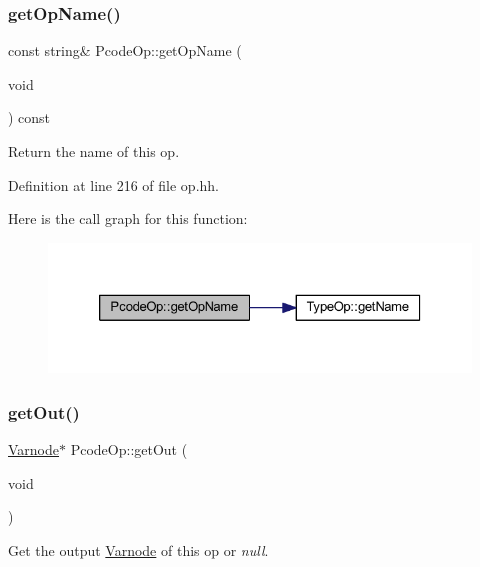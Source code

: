\subsubsection{\texorpdfstring{getOpName()}{getOpName()}}
{\footnotesize\ttfamily const string\& Pcode\+Op\+::get\+Op\+Name (\begin{DoxyParamCaption}\item[{void}]{ }\end{DoxyParamCaption}) const\hspace{0.3cm}{\ttfamily [inline]}}



Return the name of this op. 



Definition at line 216 of file op.\+hh.

Here is the call graph for this function\+:
\nopagebreak
\begin{figure}[H]
\begin{center}
\leavevmode
\includegraphics[width=326pt]{class_pcode_op_a48b3ad5fe1afa59cee1be17d1ef5875f_cgraph}
\end{center}
\end{figure}
\mbox{\label{class_pcode_op_a71498bcea3f59f0eb5878e56536d68c3}} 
\subsubsection{\texorpdfstring{getOut()}{getOut()}\hspace{0.1cm}{\footnotesize\ttfamily [1/2]}}
{\footnotesize\ttfamily \mbox{\hyperlink{class_varnode}{Varnode}}$\ast$ Pcode\+Op\+::get\+Out (\begin{DoxyParamCaption}\item[{void}]{ }\end{DoxyParamCaption})\hspace{0.3cm}{\ttfamily [inline]}}



Get the output \mbox{\hyperlink{class_varnode}{Varnode}} of this op or {\itshape null}. 



